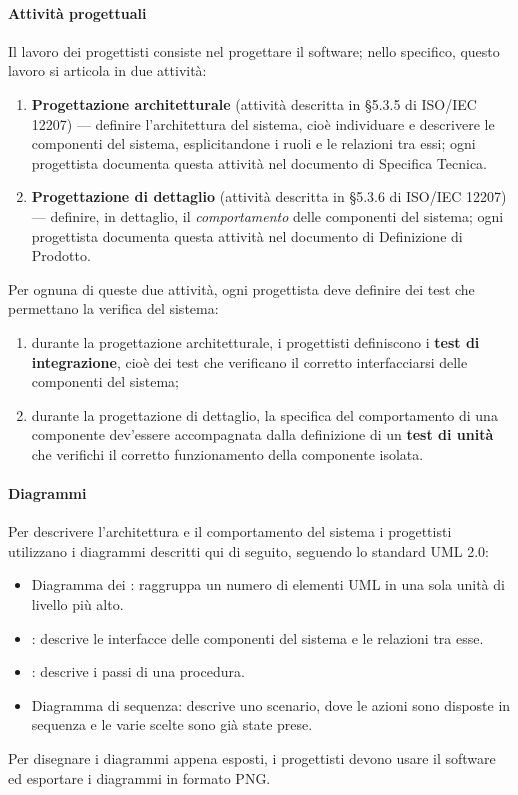 	\paragraph{Attività progettuali} Il lavoro dei progettisti consiste nel progettare il software; nello specifico, questo lavoro si articola in due attività:
	\begin{enumerate}
		\item \textbf{Progettazione architetturale} (attività descritta in §5.3.5 di ISO/IEC 12207) --- definire l'architettura del sistema, cioè individuare e descrivere le componenti del sistema, esplicitandone i ruoli e le relazioni tra essi; ogni progettista documenta questa attività nel documento di Specifica Tecnica.
		\item \textbf{Progettazione di dettaglio} (attività descritta in §5.3.6 di ISO/IEC 12207) --- definire, in dettaglio, il \emph{comportamento} delle componenti del sistema; ogni progettista documenta questa attività nel documento di Definizione di Prodotto.
	\end{enumerate}
	Per ognuna di queste due attività, ogni progettista deve definire dei test che permettano la verifica del sistema:
	\begin{enumerate}
		\item durante la progettazione architetturale, i progettisti definiscono i \textbf{test di integrazione}, cioè dei test che verificano il corretto interfacciarsi delle componenti del sistema;
		\item durante la progettazione di dettaglio, la specifica del comportamento di una componente dev'essere accompagnata dalla definizione di un \textbf{test di unità} che verifichi il corretto funzionamento della componente isolata.
	\end{enumerate}

	\paragraph{Diagrammi} Per descrivere l'architettura e il comportamento del sistema i progettisti utilizzano i diagrammi  descritti qui di seguito, seguendo lo standard UML 2.0:
	\begin{itemize}
		\item Diagramma dei : raggruppa un numero di elementi UML in una sola unità di livello più alto.
		\item {}: descrive le interfacce delle componenti del sistema e le relazioni tra esse.
		\item {}: descrive i passi di una procedura.
		\item Diagramma di sequenza: descrive uno scenario, dove le azioni sono disposte in sequenza e le varie scelte sono già state prese.
	\end{itemize}
	Per disegnare i diagrammi appena esposti, i progettisti devono usare il software  ed esportare i diagrammi in formato PNG.


